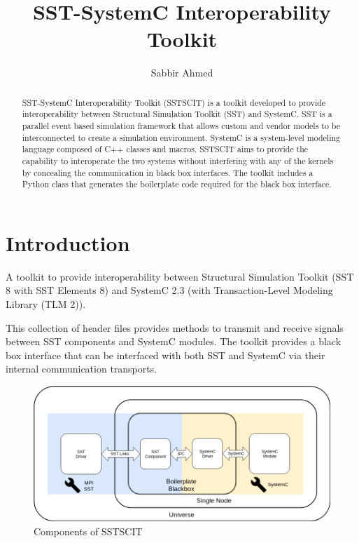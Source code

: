 \documentclass{article}
\title{SST-SystemC Interoperability Toolkit}
\author{
  Sabbir Ahmed
}
\begin{document}
  \maketitle

  \begin{abstract}
    SST-SystemC Interoperability Toolkit (SSTSCIT) is a toolkit developed to provide interoperability between Structural Simulation Toolkit (SST) and SystemC. SST is a parallel event based simulation framework that allows custom and vendor models to be interconnected to create a simulation environment. SystemC is a system-level modeling language composed of C++ classes and macros. SSTSCIT aims to provide the capability to interoperate the two systems without interfering with any of the kernels by concealing the communication in black box interfaces. The toolkit includes a Python class that generates the boilerplate code required for the black box interface.
  \end{abstract}

  \section{Introduction}
  A toolkit to provide interoperability between Structural Simulation Toolkit (SST 8 with SST Elements 8) and SystemC 2.3 (with Transaction-Level Modeling Library (TLM 2)).

  This collection of header files provides methods to transmit and receive signals between SST components and SystemC modules. The toolkit provides a black box interface that can be interfaced with both SST and SystemC via their internal communication transports. 

  \begin{figure}[!h]
    \centering
    \includegraphics[width=6in]{comm.png}
    \caption{Components of SSTSCIT}
    \label{fig:fig1}
  \end{figure}
\end{document}
